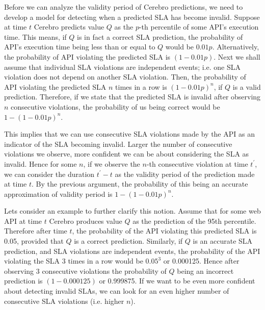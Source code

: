 Before we can analyze the validity period of Cerebro predictions, we need to develop a model for detecting when a predicted SLA
has become invalid. Suppose at time $t$ Cerebro predicts value $Q$ as the $p$-th percentile of some API's execution time.
This means, if $Q$ is in fact a correct SLA prediction, the probability of API's execution time being less than or equal to $Q$ would be $0.01p$. 
Alternatively, the probability
of API violating the predicted SLA is $(1-0.01p)$. 
Next we shall assume that individual SLA violations are independent events; i.e. one SLA violation does 
not depend on another SLA violation.
Then,
the probability of API violating the predicted SLA $n$ times in a row is $(1-0.01p)^n$, if $Q$ is a valid prediction. 
Therefore, if we state that the 
predicted SLA is invalid after observing $n$ consecutive violations, the probability of us being correct would be $1 - (1-0.01p)^n$. 

This implies that we can use consecutive SLA violations made by the API as an indicator of the SLA becoming
invalid. Larger the number of consecutive violations we observe, more confident we can be about considering the SLA as invalid. 
Hence for some $n$, if we observe
the $n$-th consecutive violation at time $t^\prime$, we can consider the duration $t^\prime - t$ as the validity period of the prediction made 
at time $t$. By the previous argument, the probability of this being an accurate approximation of validity period is $1 - (1-0.01p)^n$.

Lets consider an example to further clarify this notion. Assume that for some web API at time $t$ Cerebro produces value $Q$ as the 
prediction of the 95th percentile. Therefore after time $t$, the probability of the API violating this predicted SLA is 0.05, provided
that $Q$ is a correct prediction. Similarly, if $Q$ is an accurate SLA prediction, and SLA violations are independent events, the probability of the API
violating the SLA 3 times in a row would be $0.05^3$ or 0.000125. Hence after observing 3 consecutive violations the probability of $Q$
being an incorrect prediction is $(1 - 0.000125)$ or 0.999875. If we want to be even more confident about detecting invalid SLAs, 
we can look for an even higher
number of consecutive SLA violations (i.e. higher $n$).  


